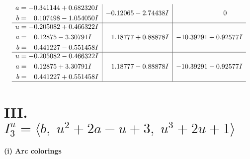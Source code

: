 \documentclass[1p]{elsarticle_modified}
\theoremstyle{definition}
\begin{document}
$$\begin{array}{c|c|c}
\begin{aligned}
a &= -0.341144 + 0.682320 I \\
b &= \phantom{-}0.107498 - 1.054050 I\end{aligned}
 & -0.12065 - 2.74438 I & \phantom{-0.000000 } 0 \\ \hline\begin{aligned}
u &= -0.205082 + 0.466322 I \\
a &= \phantom{-}0.12875 - 3.30791 I \\
b &= \phantom{-}0.441227 - 0.551458 I\end{aligned}
 & \phantom{-}1.18777 + 0.88878 I & -10.39291 + 0.92577 I \\ \hline\begin{aligned}
u &= -0.205082 - 0.466322 I \\
a &= \phantom{-}0.12875 + 3.30791 I \\
b &= \phantom{-}0.441227 + 0.551458 I\end{aligned}
 & \phantom{-}1.18777 - 0.88878 I & -10.39291 - 0.92577 I\\
 \hline 
 \end{array}$$\newpage\newpage\renewcommand{\arraystretch}{1}
\centering \section*{III. $I^u_{3}= \langle b,\;u^2+2 a- u+3,\;u^3+2 u+1 \rangle$}
\flushleft \textbf{(i) Arc colorings}\\
\end{document}
